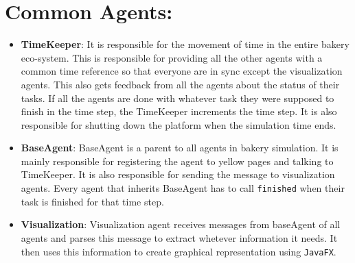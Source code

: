\documentclass[12pt]{article}
\begin{document}
\section{Common Agents:}
\begin{itemize}
    \item \textbf{TimeKeeper}: 
 It is responsible for the movement of time in the entire bakery eco-system.
 This is responsible for providing all the other agents with a common time reference so that everyone are in sync except the visualization agents.
 This also gets feedback from all the agents about the status of their tasks.
 If all the agents are done with whatever task they were supposed to finish in the time step, the TimeKeeper increments the time step. 
 It is also responsible for shutting down the platform when the simulation time ends.
\item \textbf{BaseAgent}:
BaseAgent is a parent to all agents in bakery simulation.
It is mainly responsible for registering the agent to yellow pages and talking to TimeKeeper.
It is also responsible for sending the message to visualization agents.
Every agent that inherits BaseAgent has to call \texttt{finished} when their task is finished for that time step.
\item \textbf{Visualization}:
Visualization agent receives messages from baseAgent of all agents and parses this message to extract whetever information it needs.
It then uses this information to create graphical representation using \texttt{JavaFX}.
\end{itemize}



\end{document}
